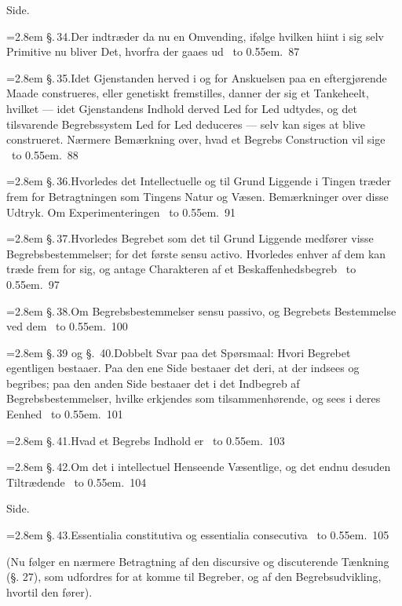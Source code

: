 \documentclass[12pt]{book}
\def\textit#1{#1}%
\def\\{ }%
\newcommand{\ovside}{\par\nopagebreak\hfill{\footnotesize Side.}\par\nobreak\vspace{0.2\baselineskip}}
\newcommand{\ovnote}[1]{%
  \par\vspace{0.5\baselineskip}\begin{center}\begin{minipage}{0.86\linewidth}
  \centering #1\end{minipage}\end{center}\vspace{0.4\baselineskip}}
\newcommand{\ovline}[3]{%
  \par\vspace{0.25\baselineskip}%
  \noindent\hangindent=2.8em\hangafter=1
  \textit{\S.\,#1.}\quad #2%
  \nobreak\ \leaders\hbox to 0.55em{\hss.\hss}\hfill\ \textit{#3}\par}
\begin{document}
\ovside
\ovline{34}{Der indtræder da nu en Omvending, ifølge hvilken hiint i sig selv
  Primitive nu bliver Det, hvorfra der gaaes ud}{87}
\ovline{35}{Idet Gjenstanden herved i og for Anskuelsen paa en eftergjørende
  Maade construeres, eller genetiskt fremstilles, danner der sig et Tankeheelt,
  hvilket --- idet Gjenstandens Indhold derved Led for Led udtydes, og det
  tilsvarende Begrebssystem Led for Led deduceres --- selv kan siges at blive
  construeret. Nærmere Bemærkning over, hvad et Begrebs Construction vil
  sige}{88}
\ovline{36}{Hvorledes det Intellectuelle og til Grund Liggende i Tingen træder
  frem for Betragtningen som Tingens Natur og Væsen. Bemærkninger over disse
  Udtryk. Om Experimenteringen}{91}
\ovline{37}{Hvorledes Begrebet som det til Grund Liggende medfører visse
  Begrebsbestemmelser; for det første \textit{sensu activo}. Hvorledes enhver af
  dem kan træde frem for sig, og antage Charakteren af et
  Beskaffenhedsbegreb}{97}
\ovline{38}{Om Begrebsbestemmelser \textit{sensu passivo}, og Begrebets
  Bestemmelse ved dem}{100}
\ovline{39 og\\ §.~40}{Dobbelt Svar paa det Spørsmaal: Hvori Begrebet
  egentligen bestaaer. Paa den ene Side bestaaer det deri, at der indsees og
  begribes; paa den anden Side bestaaer det i det Indbegreb af
  Begrebsbestemmelser, hvilke erkjendes som tilsammenhørende, og sees i deres
  Eenhed}{101}
\ovline{41}{Hvad et Begrebs Indhold er}{103}
\ovline{42}{Om det i intellectuel Henseende Væsentlige, og det endnu desuden
  Tiltrædende}{104}

\ovside
\ovline{43}{\textit{Essentialia constitutiva} og
  \textit{essentialia consecutiva}}{105}

\ovnote{(Nu følger en nærmere Betragtning af den discursive og discuterende
  Tænkning (§. 27), som udfordres for at komme til Begreber, og af den
  Begrebsudvikling, hvortil den fører).}
\end{document}
